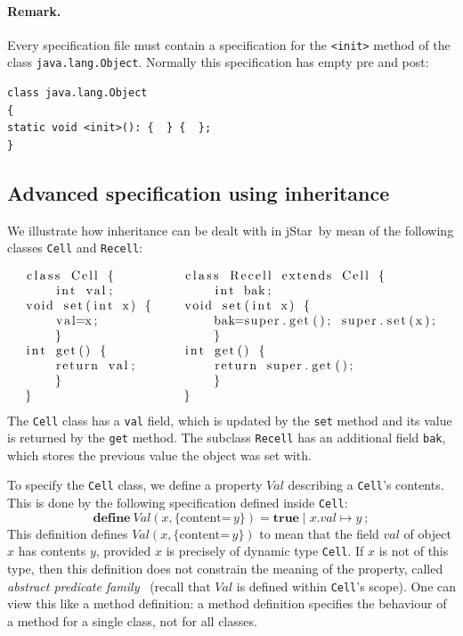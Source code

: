 \documentclass[11pt]{article}
\newcommand{\jStar}{{\sf jStar}}
\newcommand{\Val}{\mathit{Val}}
\newcommand{\define}{\mathbf{define} \ }
\newcommand{\content}[1]{\{\text{content=} \, #1 \}}
\newcommand{\true}{\mathbf{true}}
\newcommand{\symbolicheap}[2]{#1 \mid #2}
\def\J{\lstinline}
\newcommand{\JS}[1]{$\mathit{#1}$}
\begin{document}
\paragraph{Remark.} 
Every specification file must contain a specification for the {\tt <init>} method of the class {\tt java.lang.Object}. Normally this specification has empty pre and post:
\begin{verbatim}
class java.lang.Object 
{
static void <init>(): {  } {  };
}
\end{verbatim}

\subsection{Advanced specification using inheritance}
We illustrate how inheritance can be dealt with in \jStar \ by mean of the following classes
\J~Cell~ and \J~Recell~:
\[\begin{tabular}{@{}ll@{}}\begin{lstlisting}
class Cell {
    int val;

    void set(int x) {
	val=x;
    }

    int get() {
	return val;
    }
}
\end{lstlisting}&\hspace{1em}
\begin{lstlisting}
class Recell extends Cell {
    int bak;

    void set(int x) {
	bak=super.get(); super.set(x);
    }

    int get() {
	return super.get();
    }
}
\end{lstlisting}
\end{tabular}
\]
The \J~Cell~ class has a \J~val~ field, which is updated by the
\J~set~ method and its value is returned by the \J~get~ method.  The
subclass \J~Recell~ has an additional field \J~bak~, which stores the
previous value the object was set with. 

To specify the \J~Cell~ class, we define a property \JS{Val} describing a \J~Cell~'s contents.  This is done by  the following 
specification defined inside \J~Cell~:
%
\begin{equation}
\label{eq:val}
  \define \Val(x,\content y ) = \symbolicheap{\true}{ x.val \mapsto y} \  ;
\end{equation}
%
%
This definition defines $\Val(x,\content y)$ to mean that the
field \JS{val} of object $x$ has contents $y$, provided $x$ is
precisely of dynamic type \J~Cell~.  If $x$ is not of this type,
then this definition does not constrain the meaning of the property,
called \emph{abstract predicate family}~\cite{parkinson05} (recall that $\Val$ is defined within \J~Cell~'s scope).  One can
view this like a method definition: a method definition specifies the
behaviour of a method for a single class, not for all classes.
\end{document}
